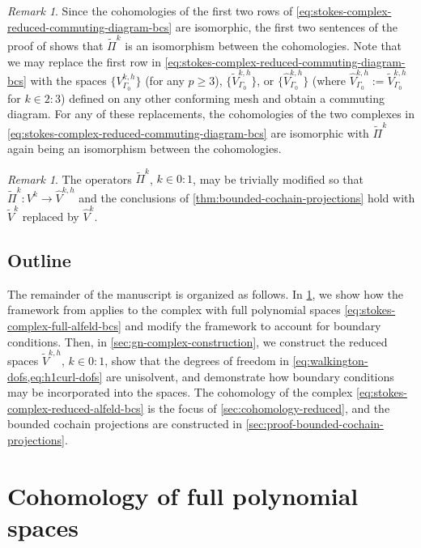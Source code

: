 \documentclass{mcom-l}
\theoremstyle{definition}
\theoremstyle{remark}
\newtheorem{remark}[theorem]{Remark}
\numberwithin{equation}{section}
\begin{document}
\begin{remark}
	Since the cohomologies of the first two rows of 
	\cref{eq:stokes-complex-reduced-commuting-diagram-bcs} are isomorphic,
	the first two sentences of the proof of \cite[Theorem 5.1]{Arnold18} 
	shows that $\tilde{\Pi}^k$ is an isomorphism between the cohomologies.
	Note that we may replace the first row in
	\cref{eq:stokes-complex-reduced-commuting-diagram-bcs} with
	the spaces $\{ V_{\Gamma_0}^{k,h} \}$ (for any $p \geq 3$), 
	$\{ \tilde{V}_{\Gamma_0}^{k, h} \}$, or 
	$\{ \hat{V}_{\Gamma_0}^{k,h} \}$ (where $\hat{V}_{\Gamma_0}^{k,h} := \tilde{V}_{\Gamma_0}^{k,h}$ for 
	$k \in 2:3$) defined on any other conforming mesh and obtain 
	a commuting diagram. For any of these replacements, the cohomologies 
	of the two complexes in 
	\cref{eq:stokes-complex-reduced-commuting-diagram-bcs} are  
	isomorphic with $\tilde{\Pi}^k$ again being an isomorphism between the 
	cohomologies.
\end{remark}

\begin{remark}
	The operators $\tilde{\Pi}^k$, $k \in 0:1$, may be trivially modified 
	so that $\tilde{\Pi}^k : V^k \to \hat{V}^{k, h}$ and 
	the conclusions of \cref{thm:bounded-cochain-projections} hold with 
	$\tilde{V}^k$ replaced by $\hat{V}^k$.
\end{remark}


\subsection{Outline}

The remainder of the manuscript is organized as follows. In 
\cref{sec:cohomology-full-poly-space}, we show how the framework 
from \cite{HuLiangLin25} applies to the complex with full polynomial
spaces \cref{eq:stokes-complex-full-alfeld-bcs} and modify the framework 
to account for boundary conditions. Then, in \cref{sec:gn-complex-construction},
we construct the reduced spaces $\tilde{V}^{k, h}$, $k \in 0:1$, show that 
the degrees of freedom in \cref{eq:walkington-dofs,eq:h1curl-dofs} are 
unisolvent, and demonstrate how boundary conditions may be incorporated into 
the spaces.
The cohomology of the complex 
\cref{eq:stokes-complex-reduced-alfeld-bcs} is the focus of 
\cref{sec:cohomology-reduced}, and the bounded cochain projections 
are constructed in \cref{sec:proof-bounded-cochain-projections}.


\section{Cohomology of full polynomial spaces}
\label{sec:cohomology-full-poly-space}
\end{document}
